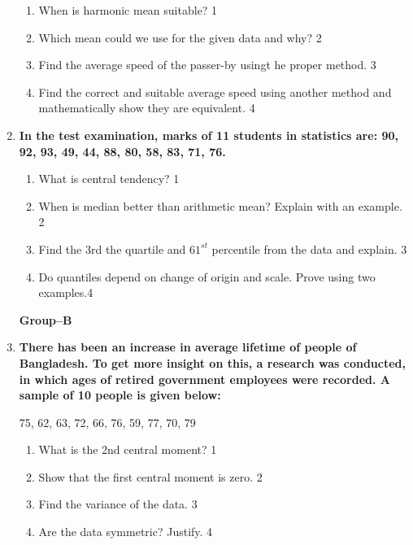 \documentclass{article}
\begin{document}
\begin{enumerate}
  \begin{enumerate}
    \item
	When is harmonic mean suitable? \hfill 1
    \item
	Which mean could we use for the given data and why? \hfill 2
    \item  
	Find the average speed of the passer-by usingt he proper method. \hfill 3
    \item
	Find the correct and suitable average speed using another method and mathematically show they are equivalent. \hfill 4
  \end{enumerate}

    \item
  \textbf{In the test examination, marks of 11 students in statistics are: 90, 92, 93, 49, 44, 88, 80, 58, 83, 71, 76.}
  \begin{enumerate}
    \item
	What is central tendency? \hfill 1
    \item
	When is median better than arithmetic mean? Explain with an example. \hfill 2
    \item  
	Find the 3rd the quartile and $61^{st}$ percentile from the data and explain.  \hfill 3
    \item
	Do quantiles depend on change of origin and scale. Prove using two examples.\hfill 4
\end{enumerate}


  

    \begin{center}
  \textbf{Group--B}
  \end{center}
  
     \item
	  \textbf{There has been an increase in average lifetime of people of Bangladesh. To get more insight on this, a research was conducted, in which ages of retired government employees were recorded. A sample of 10 people is given below:}
	  
	  \begin{center}
	  75, 62, 63, 72, 66, 76, 59, 77, 70, 79
	  \end{center}
    \begin{enumerate}
    \item
	What is the 2nd central moment? \hfill 1
    \item
	Show that the first central moment is zero. \hfill 2
    \item  
	Find the variance of the data. \hfill 3
    \item
	Are the data symmetric? Justify. \hfill 4
  \end{enumerate}
  

\end{enumerate}
\end{document}
